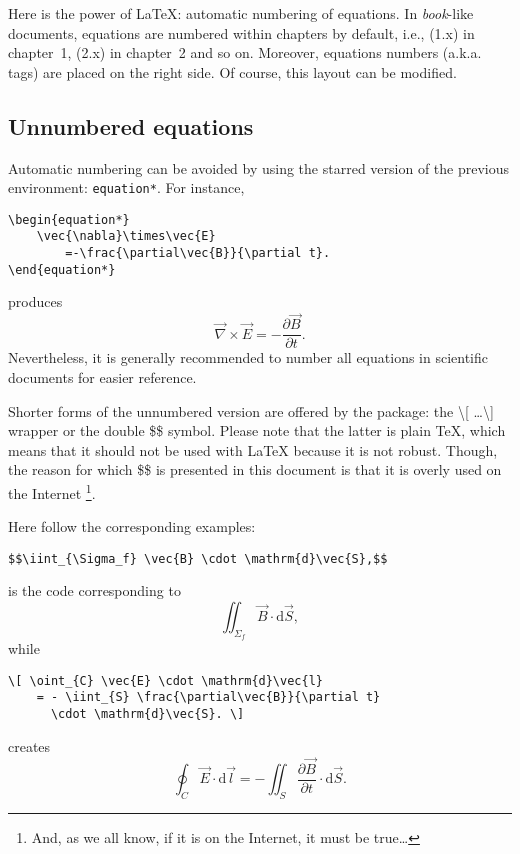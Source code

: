 	
	Here is the power of \LaTeX{}: automatic numbering of equations.
	In \emph{book}-like documents, equations are numbered within chapters by default, i.e., (1.x) in chapter~1, (2.x) in chapter~2 and so on.
	Moreover, equations numbers (a.k.a. tags) are placed on the right side.
	Of course, this layout can be modified.
	
	
	
	\subsection{Unnumbered equations}
	
	
		Automatic numbering can be avoided by using the starred version of the previous environment: \texttt{equation*}.
		For instance,
\begin{lstlisting}[language={[LaTeX]TeX}]
\begin{equation*}
	\vec{\nabla}\times\vec{E}
		=-\frac{\partial\vec{B}}{\partial t}.
\end{equation*}
\end{lstlisting}	
		produces
		\begin{equation*}
			\vec{\nabla}\times\vec{E}
				=-\frac{\partial\vec{B}}{\partial t}.
		\end{equation*}
		Nevertheless, it is generally recommended to number all equations in scientific documents for easier reference.
		
		
		Shorter forms of the unnumbered version are offered by the package: the \textbackslash{}[ \ldots \textbackslash{}] wrapper or the double \$\$ symbol.
		Please note that the latter is plain \TeX{}, which means that it should not be used with \LaTeX{} because it is not robust.
		Though, the reason for which \$\$ is presented in this document is that it is overly used on the Internet \footnote{And, as we all know, if it is on the Internet, it must be true\ldots}.
		
		Here follow the corresponding examples:
\begin{lstlisting}[language={[LaTeX]TeX}]
$$\iint_{\Sigma_f} \vec{B} \cdot \mathrm{d}\vec{S},$$
\end{lstlisting}
		is the code corresponding to
		$$ \iint_{\Sigma_f} \vec{B} \cdot \mathrm{d}\vec{S}, $$
		while
\begin{lstlisting}[language={[LaTeX]TeX}]
\[ \oint_{C} \vec{E} \cdot \mathrm{d}\vec{l}
	= - \iint_{S} \frac{\partial\vec{B}}{\partial t}
	  \cdot \mathrm{d}\vec{S}. \]
\end{lstlisting}
		creates
		\[ \oint_{C} \vec{E} \cdot \mathrm{d}\vec{l}
			= - \iint_{S} \frac{\partial\vec{B}}{\partial t}
			  \cdot \mathrm{d}\vec{S}. \]
			  
